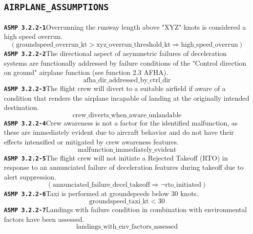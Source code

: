\documentclass[11pt,a4paper]{article}
\begin{document}
\subsection*{\texttt{AIRPLANE\_ASSUMPTIONS}}
\noindent\textbf{\texttt{ASMP 3.2.2-1}}\quad Overrunning the runway length above "XYZ" knots is considered a high speed overrun.
\begin{dmath*}
(\text{groundspeed\_overrun\_kt} > \text{xyz\_overrun\_threshold\_kt} \Rightarrow \text{high\_speed\_overrun})
\end{dmath*}
\noindent\textbf{\texttt{ASMP 3.2.2-2}}\quad The directional aspect of asymmetric failures of deceleration systems are functionally addressed by failure conditions of the "Control direction on ground" airplane function (see function 2.3 AFHA).
\begin{dmath*}
\text{afha\_dir\_addressed\_by\_ctrl\_dir}
\end{dmath*}
\noindent\textbf{\texttt{ASMP 3.2.2-3}}\quad The flight crew will divert to a suitable airfield if aware of a condition that renders the airplane incapable of landing at the originally intended destination.
\begin{dmath*}
\text{crew\_diverts\_when\_aware\_unlandable}
\end{dmath*}
\noindent\textbf{\texttt{ASMP 3.2.2-4}}\quad Crew awareness is not a factor for the identified malfunction, as these are immediately evident due to aircraft behavior and do not have their effects intensified or mitigated by crew awareness features.
\begin{dmath*}
\text{malfunction\_immediately\_evident}
\end{dmath*}
\noindent\textbf{\texttt{ASMP 3.2.2-5}}\quad The flight crew will not initiate a Rejected Takeoff (RTO) in response to an annunciated failure of deceleration features during takeoff due to alert suppression.
\begin{dmath*}
(\text{annunciated\_failure\_decel\_takeoff} \Rightarrow \neg \text{rto\_initiated})
\end{dmath*}
\noindent\textbf{\texttt{ASMP 3.2.2-6}}\quad Taxi is performed at groundspeeds below 30 knots.
\begin{dmath*}
\text{groundspeed\_taxi\_kt} < 30
\end{dmath*}
\noindent\textbf{\texttt{ASMP 3.2.2-7}}\quad Landings with failure condition in combination with environmental factors have been assessed.
\begin{dmath*}
\text{landings\_with\_env\_factors\_assessed}
\end{dmath*}
\end{document}
